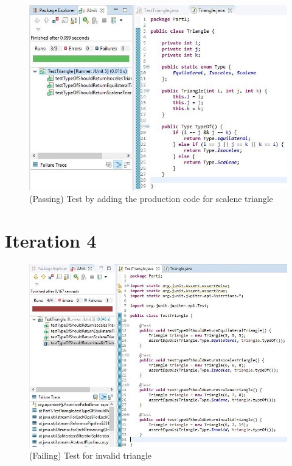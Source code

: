 \documentclass[9pt]{article}
\begin{document}
\begin{figure}[htb]
    \includegraphics[width=\linewidth]{./pics/p6.JPG}
    \caption{(Passing) Test by adding the production code for scalene triangle}
\end{figure}

\clearpage{}

\section{Iteration 4}

\begin{figure}[htb]
    \includegraphics[width=\linewidth]{./pics/p7.JPG}
    \caption{(Failing) Test for invalid triangle}
\end{figure}
\end{document}
